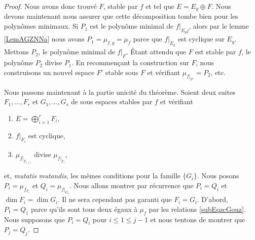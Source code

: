 \begin{proof}
    Nous avons donc trouvé \( F\), stable par \( f\) et tel que \( E=E_y\oplus F\). Nous devons maintenant nous assurer que cette décomposition tombe bien pour les polynômes minimaux. Si \( P_1\) est le polynôme minimal de \( f|_{E_yj}\), alors par le lemme \ref{LemAGZNNa} nous avons \( P_1=\mu_{f,y}=\mu_f\) parce que \( f|_{E_y}\) est cyclique sur \( E_y\). Mettons \( P_2\), le polynôme minimal de \( f|_F\). Étant attendu que \( F\) est stable par \( f\), le polynôme \( P_2\) divise \( P_1\). En recommençant la construction sur \( F\), nous construisons un nouvel espace \( F'\) stable sous \( F\) et vérifiant \( \mu_{f|_{F'}}=P_2\), etc.

    Nous passons maintenant à la partie unicité du théorème. Soient deux suites \( F_1,\ldots, F_r\) et \( G_1,\ldots, G_s\) de sous espaces stables par \( f\) et vérifiant
    \begin{enumerate}
        \item
            \( E=\bigoplus_{i=1}^rF_i\),
        \item
            \( f|_{F_i}\) est cyclique,
        \item
            \( \mu_{f|_{F_{i+1}}}\) divise \( \mu_{f|_{F_i}}\),
    \end{enumerate}
    et, \emph{mutatis mutandis}, les mêmes conditions pour la famille \( \{ G_i \}\). Nous posons \( P_i=\mu_{f_{F_i}}\) et \( Q_i=\mu_{f|_{G_i}}\). Nous allons montrer par récurrence que \( P_i=Q_i\) et \( \dim F_i=\dim G_i\). Il ne sera cependant pas garanti que \( F_i=G_i\). D'abord, \( P_1=Q_1\) parce qu'ils sont tous deux égaux à \( \mu_f\) par les relations \eqref{subEqzcGouz}. Nous supposons que \( P_i=Q_i\) pour \( i\leq 1\leq j-1\) et nous tentons de montrer que \( P_j=Q_j\).


\end{proof}
